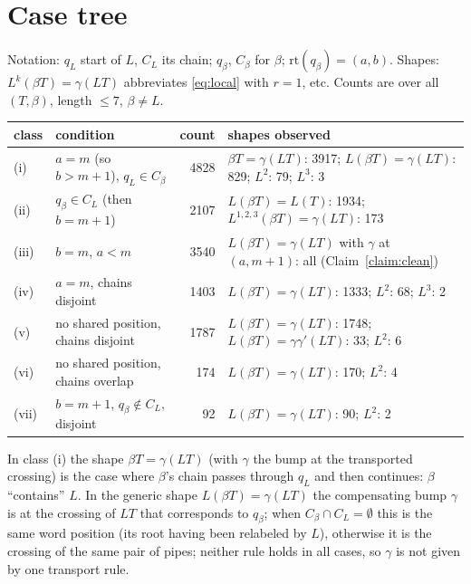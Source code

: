 \documentclass{amsart}
\theoremstyle{definition}
\theoremstyle{remark}
\newcommand{\rt}{\mathrm{rt}}
\begin{document}
\section{Case tree}\label{sec:tree}

Notation: $q_L$ start of $L$, $C_L$ its chain; $q_\beta$, $C_\beta$ for $\beta$; $\rt(q_\beta)=(a,b)$. Shapes: $L^k(\beta T)=\gamma(LT)$ abbreviates \eqref{eq:local} with $r=1$, etc. Counts are over all $(T,\beta)$, length $\leq7$, $\beta\neq L$.

\begin{center}\small
\begin{tabular}{@{}llrl@{}}
\toprule
class & condition & count & shapes observed \\
\midrule
(i) & $a=m$ (so $b>m+1$), $q_L\in C_\beta$ & 4828 & $\beta T=\gamma(LT)$: 3917; $L(\beta T)=\gamma(LT)$: 829; $L^2$: 79; $L^3$: 3 \\
(ii) & $q_\beta\in C_L$ (then $b=m+1$) & 2107 & $L(\beta T)=L(T)$: 1934; $L^{1,2,3}(\beta T)=\gamma(LT)$: 173 \\
(iii) & $b=m$, $a<m$ & 3540 & $L(\beta T)=\gamma(LT)$ with $\gamma$ at $(a,m+1)$: all (Claim~\ref{claim:clean}) \\
(iv) & $a=m$, chains disjoint & 1403 & $L(\beta T)=\gamma(LT)$: 1333; $L^2$: 68; $L^3$: 2 \\
(v) & no shared position, chains disjoint & 1787 & $L(\beta T)=\gamma(LT)$: 1748; $L(\beta T)=\gamma\gamma'(LT)$: 33; $L^2$: 6 \\
(vi) & no shared position, chains overlap & 174 & $L(\beta T)=\gamma(LT)$: 170; $L^2$: 4 \\
(vii) & $b=m+1$, $q_\beta\notin C_L$, disjoint & 92 & $L(\beta T)=\gamma(LT)$: 90; $L^2$: 2 \\
\bottomrule
\end{tabular}
\end{center}

\noindent In class (i) the shape $\beta T=\gamma(LT)$ (with $\gamma$ the bump at the transported crossing) is the case where $\beta$'s chain passes through $q_L$ and then continues: $\beta$ ``contains'' $L$. In the generic shape $L(\beta T)=\gamma(LT)$ the compensating bump $\gamma$ is at the crossing of $LT$ that corresponds to $q_\beta$; when $C_\beta\cap C_L=\emptyset$ this is the same word position (its root having been relabeled by $L$), otherwise it is the crossing of the same pair of pipes; neither rule holds in all cases, so $\gamma$ is not given by one transport rule.
\end{document}
